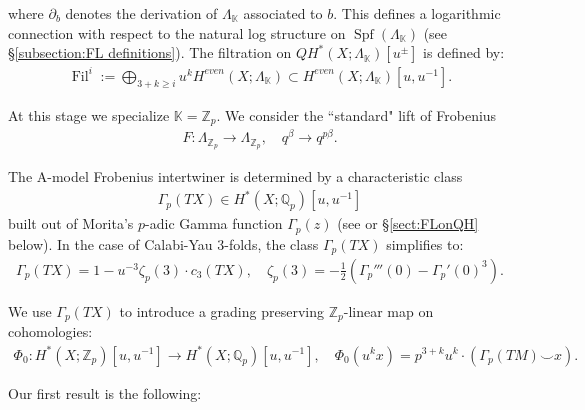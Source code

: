 \documentclass[reqno]{amsart}
\numberwithin{equation}{section}
\numberwithin{equation}{section}
\numberwithin{equation}{section}
\theoremstyle{definition}
\theoremstyle{remark}
\theoremstyle{remark}
\begin{document}
where $\partial_b$ denotes the derivation of  $\Lambda_{\mathbb{K}}$ associated to $b$. This defines a logarithmic connection with respect to the natural log structure on $\operatorname{Spf}(\Lambda_\mathbb{K})$ (see \S \ref{subsection:FL definitions}). The filtration on $QH^*(X;\Lambda_{\mathbb{K}})[u^{\pm}]$ is defined by: \begin{align}\operatorname{Fil}^i := \bigoplus_{3+k \geq i} u^kH^{even}(X; \Lambda_\mathbb{K}) \subset H^{even}(X; \Lambda_\mathbb{K})[u,u^{-1}]. \end{align}

At this stage we specialize $\mathbb{K}=\mathbb{Z}_p.$ We consider the ``standard" lift of Frobenius \begin{align} F: \Lambda_{\mathbb{Z}_p} \to \Lambda_{\mathbb{Z}_p}, \quad q^{\beta} \to q^{p\beta}. \end{align}

The A-model Frobenius intertwiner is determined by a characteristic class \begin{align} \Gamma_p(TX) \in H^*(X; \mathbb{Q}_p)[u,u^{-1}]\end{align} built out of Morita's $p$-adic Gamma function $\Gamma_p(z)$ (see \cite[\S 4]{bai2025p} or \S \ref{sect:FLonQH} below). In the case of Calabi-Yau 3-folds, the class $\Gamma_p(TX)$ simplifies to:  
\begin{align} \label{eq:Gammap}
\Gamma_p(TX) 
= 1 - u^{-3}\zeta_p(3) \cdot c_3(TX),\quad \zeta_p(3)= -\frac{1}{2}(\Gamma_p'''(0)-\Gamma_p'(0)^3).
\end{align}


We use $\Gamma_p(TX)$ to introduce a grading preserving $\mathbb{Z}_p$-linear map on cohomologies: \begin{align} \label{eq:b-frobenius} 
\Phi_0: H^*(X;\mathbb{Z}_p)[u,u^{-1}] \to H^*(X;\mathbb{Q}_p)[u,u^{-1}], \quad \Phi_0(u^kx) = p^{3+k} u^k\cdot(\Gamma_p(TM) \smile x). \end{align} 

Our first result is the following:
\end{document}

